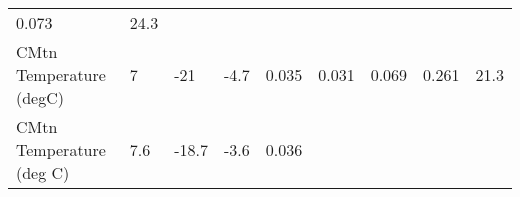\documentclass[11pt]{article}
\begin{document}
\begin{longtable}[]{@{}lllllllll@{}}
\begin{minipage}[t]{0.06\columnwidth}
0.073\strut
\end{minipage} & \begin{minipage}[t]{0.07\columnwidth}\raggedright\strut
24.3\strut
\end{minipage}\tabularnewline
\begin{minipage}[t]{0.25\columnwidth}\raggedright\strut
CMtn Temperature (degC)\strut
\end{minipage} & \begin{minipage}[t]{0.06\columnwidth}\raggedright\strut
7\strut
\end{minipage} & \begin{minipage}[t]{0.06\columnwidth}\raggedright\strut
-21\strut
\end{minipage} & \begin{minipage}[t]{0.08\columnwidth}\raggedright\strut
-4.7\strut
\end{minipage} & \begin{minipage}[t]{0.05\columnwidth}\raggedright\strut
0.035\strut
\end{minipage} & \begin{minipage}[t]{0.07\columnwidth}\raggedright\strut
0.031\strut
\end{minipage} & \begin{minipage}[t]{0.06\columnwidth}\raggedright\strut
0.069\strut
\end{minipage} & \begin{minipage}[t]{0.06\columnwidth}\raggedright\strut
0.261\strut
\end{minipage} & \begin{minipage}[t]{0.07\columnwidth}\raggedright\strut
21.3\strut
\end{minipage}\tabularnewline
\begin{minipage}[t]{0.25\columnwidth}\raggedright\strut
CMtn Temperature (deg C)\strut
\end{minipage} & \begin{minipage}[t]{0.06\columnwidth}\raggedright\strut
7.6\strut
\end{minipage} & \begin{minipage}[t]{0.06\columnwidth}\raggedright\strut
-18.7\strut
\end{minipage} & \begin{minipage}[t]{0.08\columnwidth}\raggedright\strut
-3.6\strut
\end{minipage} & \begin{minipage}[t]{0.05\columnwidth}\raggedright\strut
0.036\strut
\end{minipage} & \begin{minipage}[t]{0.07\columnwidth}\raggedright\strut

\end{minipage}
\end{longtable}
\end{document}
